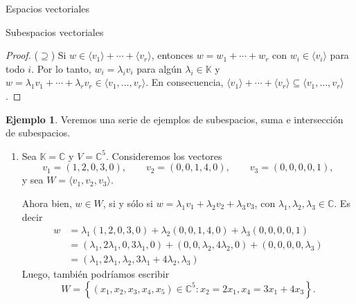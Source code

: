 \documentclass[a4paper,12pt,twoside,spanish]{amsbook}
\theoremstyle{definition}
\newtheorem{ejemplo}{Ejemplo}[section]
\theoremstyle{remark}
\newcommand{\C}{\mathbb C}
\newcommand{\K}{\mathbb K}
\begin{document}
\begin{chapter}{Espacios vectoriales}
\begin{section}{Subespacios vectoriales}
\begin{proof}
		($\supseteq$) Si $w \in \langle v_1 \rangle+ \cdots + \langle v_r \rangle$, entonces $w = w_1 + \cdots+w_r$ con $w_i \in \langle v_i\rangle$ para todo $i$. Por lo tanto, $w_i = \lambda_i v_i$ para algún $\lambda_i \in \K$ y  $w = \lambda_1 v_1 +\cdots+ \lambda_r v_r \in \langle v_1,\ldots,v_r \rangle $. En  consecuencia, $\langle v_1 \rangle+ \cdots + \langle v_r \rangle \subseteq \langle v_1,\ldots,v_r \rangle$. 
	\end{proof}

	\begin{ejemplo}\label{ejemplos2} Veremos una serie de ejemplos de subespacios,  suma e intersección de subespacios.
		\begin{enumerate}
			\item\label{ejemplos2-1} Sea $\K = \C$ y $V= \C^5$. Consideremos los vectores
			\begin{equation*}
				v_1 = (1,2,0,3,0), \qquad v_2 = (0,0,1,4,0), \qquad v_3 = (0,0,0,0,1),
			\end{equation*}
			y sea $W= \langle v_1,v_2,v_3 \rangle$. 
			
			Ahora bien, $w \in W$, si y sólo si $w = \lambda_1 v_1+\lambda_2 v_2+\lambda_3 v_3$, con $\lambda_1,\lambda_2,\lambda_3 \in \C$. Es decir
			\begin{align*}
				w &= \lambda_1 (1,2,0,3,0)+\lambda_2 (0,0,1,4,0)+\lambda_3 (0,0,0,0,1) \\
				&=  (\lambda_1,2\lambda_1,0,3\lambda_1,0)+ (0,0,\lambda_2,4\lambda_2,0)+ (0,0,0,0,\lambda_3) \\ &=(\lambda_1,2\lambda_1,\lambda_2,3\lambda_1+4\lambda_2,\lambda_3)
			\end{align*} 
			Luego,  también podríamos escribir
			\begin{equation*}
				W = \left\{(x_1,x_2,x_3,x_4,x_5)\in \C^5: x_2 = 2x_1, x_4 = 3x_1+4x_3 \right\}.
			\end{equation*}
			

\end{enumerate}
\end{ejemplo}
\end{section}
\end{chapter}
\end{document}
